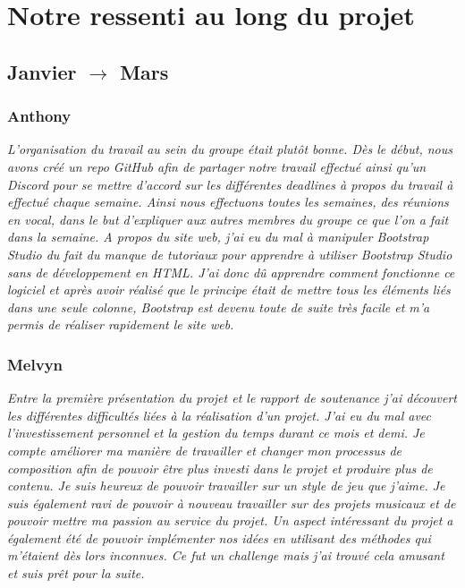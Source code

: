 \documentclass[a4paper,12pt]{article}
\begin{document}
    
    
    
    \section{Notre ressenti au long du projet}
    \subsection{Janvier $\to$ Mars}
        \subsubsection{Anthony}
        \textit{L’organisation du travail au sein du groupe était plutôt bonne.
        Dès le début, nous avons créé un repo \textsl{GitHub} afin de partager notre travail 
        effectué ainsi qu’un \textsl{Discord} pour se mettre d’accord sur les différentes 
        deadlines à propos du travail à effectué chaque semaine. Ainsi nous 
        effectuons toutes les semaines, des réunions en vocal, dans le but 
        d’expliquer aux autres membres du groupe ce que l’on a fait dans la 
        semaine. A propos du site web, j’ai eu du mal à manipuler \textsl{Bootstrap Studio} 
        du fait du manque de tutoriaux pour apprendre à utiliser \textsl{Bootstrap Studio}
        sans de développement en HTML. J’ai donc dû apprendre comment fonctionne 
        ce logiciel et après avoir réalisé que le principe était de mettre tous 
        les éléments liés dans une seule colonne, \textsl{Bootstrap} est devenu toute de 
        suite très facile et m’a permis de réaliser rapidement le site web.}
  
        \subsubsection{Melvyn}
        \textit{Entre la première présentation du projet et le rapport de soutenance
        j'ai découvert les différentes difficultés liées à la réalisation d'un projet.
        J'ai eu du mal avec l'investissement personnel et la gestion du temps durant 
        ce mois et demi. Je compte améliorer ma manière de travailler et changer mon
        processus de composition afin de pouvoir être plus investi dans le projet et 
        produire plus de contenu. Je suis heureux de pouvoir travailler sur un style de 
        jeu que j'aime. Je suis également ravi de pouvoir à nouveau travailler sur des
        projets musicaux et de pouvoir mettre ma passion au service du projet.
        Un aspect intéressant du projet a également été de pouvoir implémenter nos idées
        en utilisant des méthodes qui m'étaient dès lors inconnues. Ce fut un challenge 
        mais j'ai trouvé cela amusant et suis prêt pour la suite.}
 
\end{document}

